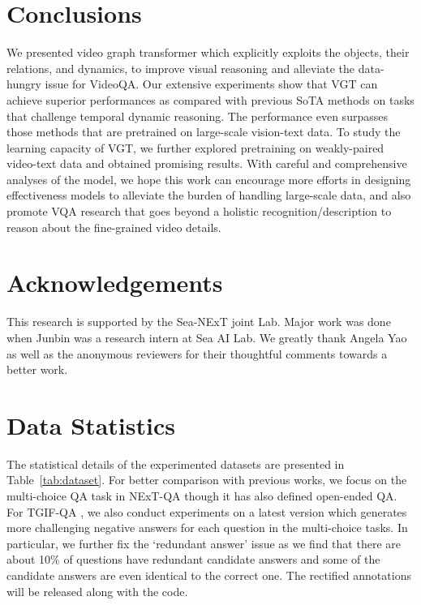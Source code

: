 \documentclass[runningheads]{llncs}
\begin{document}
\section{Conclusions}
We presented video graph transformer which explicitly exploits the objects, their relations, and dynamics, to improve visual reasoning and alleviate the data-hungry issue for VideoQA. Our extensive experiments show that VGT can achieve superior performances as compared with previous SoTA methods on tasks that challenge temporal dynamic reasoning. The performance even surpasses those methods that are pretrained on large-scale vision-text data. To study the learning capacity of VGT, we further explored pretraining on weakly-paired video-text data and obtained promising results. With careful and comprehensive analyses of the model, we hope this work can encourage more efforts in designing effectiveness models to alleviate the burden of handling large-scale data, and also promote VQA research that goes beyond a holistic recognition/description to reason about the fine-grained video details.

\section*{\small{Acknowledgements}}
\vspace{-0.3cm}
\small{This research is supported by the Sea-NExT joint Lab. Major work was done when Junbin was a research intern at Sea AI Lab. We greatly thank Angela Yao as well as the anonymous reviewers for their thoughtful comments towards a better work.}



\clearpage
\appendix
\section{Data Statistics}
\label{app:dset}
The statistical details of the experimented datasets are presented in Table~\ref{tab:dataset}. For better comparison with previous works, we focus on the multi-choice QA task in NExT-QA \cite{xiao2021next} though it has also defined open-ended QA. For TGIF-QA \cite{jang2017tgif}, we also conduct experiments on a latest version \cite{peng2021progressive} which generates more challenging negative answers for each question in the multi-choice tasks. In particular, we further fix the `redundant answer' issue as we find that there are about 10\% of questions have redundant candidate answers and some of the candidate answers are even identical to the correct one. The rectified annotations will be released along with the code.
\end{document}
